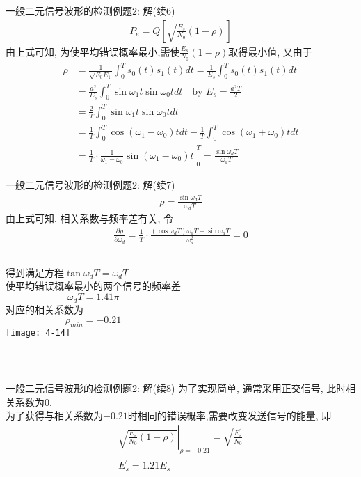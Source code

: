 \begin{frame}[shrink]{一般二元信号波形的检测例题2: 解(续6)}
\begin{align*}
P_e=Q\left[\sqrt{\frac{E_s}{N_0}(1-\rho)}\right]
\end{align*}
由上式可知, 为使平均错误概率最小,需使$\frac{E_s}{N_0}(1-\rho)$取得最小值, 又由于
\begin{align*}
\rho&=\frac{1}{\sqrt{E_{0}E_{1}}}\int_{0}^{T}s_0(t)s_1(t)dt=\frac{1}{E_s}\int_{0}^{T}s_0(t)s_1(t)dt\\
&=\frac{a^2}{E_s}\int_{0}^{T}\sin\omega_1t\sin\omega_0tdt\quad\text{by }E_s=\frac{a^2T}{2}\\
&=\frac{2}{T}\int_{0}^{T}\sin\omega_1t\sin\omega_0tdt\\
&=\frac{1}{T}\int_{0}^{T}\cos(\omega_1-\omega_0)tdt-\frac{1}{T}\int_{0}^{T}\cos(\omega_1+\omega_0)tdt\\
&=\left.\frac{1}{T}\cdot\frac{1}{\omega_1-\omega_0}\sin(\omega_1-\omega_0)t\right|_0^T=\frac{\sin\omega_dT}{\omega_dT}
\end{align*}
\end{frame}

\begin{frame}[shrink]{一般二元信号波形的检测例题2: 解(续7)}
\begin{align*}
\rho=\frac{\sin\omega_dT}{\omega_dT}
\end{align*}
由上式可知, 相关系数与频率差有关, 令
\begin{align*}
\frac{\partial\rho}{\partial\omega_d}=\frac{1}{T}\cdot\frac{(\cos\omega_dT)\omega_dT-\sin\omega_dT}{\omega_d^2}=0
\end{align*}
\begin{columns}
	得到满足方程$\tan\omega_dT=\omega_dT$\\
	使平均错误概率最小的两个信号的频率差
	\[\omega_dT=1.41\pi \]
	对应的相关系数为
	\[\rho_{min}=-0.21 \]
	\texttt{[image: 4-14]}
\end{columns}
~\\
\end{frame}

\begin{frame}[shrink]{一般二元信号波形的检测例题2: 解(续8)}
为了实现简单, 通常采用正交信号, 此时相关系数为0.\\
为了获得与相关系数为$-0.21$时相同的错误概率,需要改变发送信号的能量, 即
\begin{align*}
\left.\sqrt{\frac{E_s}{N_0}(1-\rho)}\right|_{\rho=-0.21}=\sqrt{\frac{E_s^\prime}{N_0}}\\
E_s^\prime=1.21E_s
\end{align*}
\end{frame}

